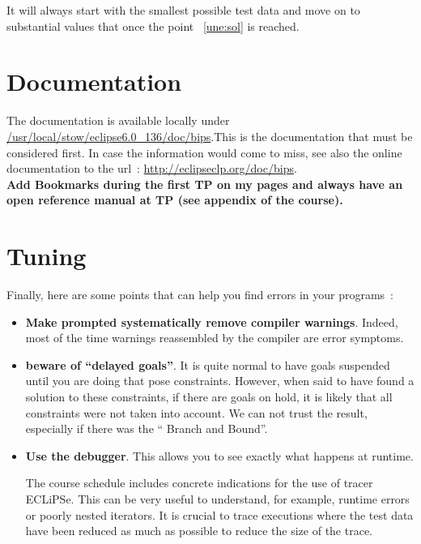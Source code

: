 It will always start with the smallest possible test data and move on to substantial values that once the point ~\ref{une:sol} is reached.

\section*{Documentation}
The \eclipse{} documentation is available locally under
\url{/usr/local/stow/eclipse6.0\_136/doc/bips}.This is the documentation that must be considered first. In case the information would come to miss, see also the online documentation to the url~: \url{http://eclipseclp.org/doc/bips}.\\

{\bf Add Bookmarks during the first TP on my pages and always have an open reference manual at TP (see appendix of the course).}


\section*{Tuning}

Finally, here are some points that can help you find errors in your programs~:

\begin{itemize}
\item {\bf Make prompted systematically remove compiler warnings}. Indeed, most of the time warnings reassembled by the compiler are error symptoms.\\  


\item {\bf beware of ``delayed goals''}. It is quite normal to have goals suspended until you are doing that pose constraints. However, when \eclipse{} said to have found a solution to these constraints, if there are goals on hold, it is likely that all constraints were not taken into account. We can not trust the result, especially if there was the `` Branch and Bound''.\\

\item {\bf Use the debugger}. This allows you to see exactly what happens at runtime.

 The course schedule includes concrete indications for the use of tracer ECLiPSe. This can be very useful to understand, for example, runtime errors or poorly nested iterators. It is crucial to trace executions where the test data have been reduced as much as possible to reduce the size of the trace.

\end{itemize}

